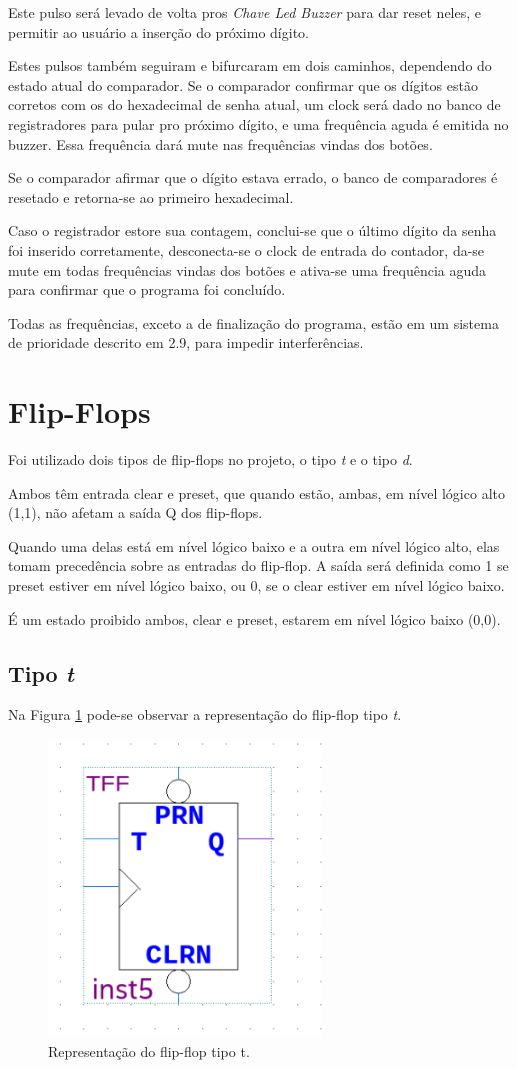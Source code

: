 Este pulso será levado de volta pros \emph{Chave Led Buzzer} para dar reset neles, e permitir ao usuário a inserção do próximo dígito.

Estes pulsos também seguiram e bifurcaram em dois caminhos, dependendo do estado atual do comparador. Se o comparador confirmar que os dígitos estão corretos com os do hexadecimal de senha atual, um clock será dado no banco de registradores para pular pro próximo dígito, e uma frequência aguda é emitida no buzzer. Essa frequência dará mute nas frequências vindas dos botões.

Se o comparador afirmar que o dígito estava errado, o banco de comparadores é resetado e retorna-se ao primeiro hexadecimal.

Caso o registrador estore sua contagem, conclui-se que o último dígito da senha foi inserido corretamente, desconecta-se o clock de entrada do contador, da-se mute em todas frequências vindas dos botões e ativa-se uma frequência aguda para confirmar que o programa foi concluído.

Todas as frequências, exceto a de finalização do programa, estão em um sistema de prioridade descrito em 2.9, para impedir interferências.



\section{Flip-Flops}

Foi utilizado dois tipos de flip-flops no projeto, o tipo \emph{t} e o tipo \emph{d}.

Ambos têm entrada clear e preset, que quando estão, ambas, em nível lógico alto (1,1), não afetam a saída Q dos flip-flops.

Quando uma delas está em nível lógico baixo e a outra em nível lógico alto, elas tomam precedência sobre as entradas do flip-flop. A saída será definida como 1 se preset estiver em nível lógico baixo, ou 0, se o clear estiver em nível lógico baixo.

É um estado proibido ambos, clear e preset, estarem em nível lógico baixo (0,0).

\subsection{Tipo \emph{t}}

Na Figura \ref{fig:2.2} pode-se observar a representação do flip-flop tipo \emph{t}.

\begin{figure}[H]
	\centering
	\includegraphics[width=0.3\columnwidth]{FIGURAS/cap_2/tff.png}
	\caption{Representação do flip-flop tipo t.}
        \label{fig:2.2}
\end{figure}

